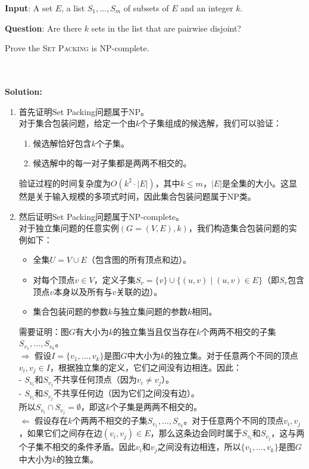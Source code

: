\documentclass{article}
\newcounter{exercise}
\newcommand{\<}{
    \langle}
\renewcommand{\>}{
    \rangle}
\begin{document}
{\begin{exercise}
{\bf Input}: A set $E$, a list $S_1,\ldots, S_m$ of subsets of $E$ and an integer $k$.

{\bf Question}: Are there $k$ sets in the list that are pairwise disjoint?

Prove the \textsc{Set Packing} is NP-complete.
\end{exercise}
\\\\
\noindent\textbf{Solution:}
\begin{enumerate}
    \item 首先证明Set Packing问题属于NP。\\
    对于集合包装问题，给定一个由$k$个子集组成的候选解，我们可以验证：
    \begin{enumerate}
        \item 候选解恰好包含$k$个子集。
        \item 候选解中的每一对子集都是两两不相交的。
    \end{enumerate}
    验证过程的时间复杂度为$O(k^2 \cdot |E|)$，其中$k \leq m$，$|E|$是全集的大小。这显然是关于输入规模的多项式时间，因此集合包装问题属于NP类。
    \item 然后证明Set Packing问题属于NP-complete。\\
    对于独立集问题的任意实例$(G=(V,E), k)$，我们构造集合包装问题的实例如下：
    \begin{itemize}
        \item 全集$U = V \cup E$（包含图的所有顶点和边）。
        \item 对每个顶点$v \in V$，定义子集$S_v = \{v\} \cup \{ (u,v) \mid (u,v) \in E \}$（即$S_v$包含顶点$v$本身以及所有与$v$关联的边）。
        \item 集合包装问题的参数$k$与独立集问题的参数$k$相同。
    \end{itemize}
    需要证明：图$G$有大小为$k$的独立集当且仅当存在$k$个两两不相交的子集$S_{v_1},\dots,S_{v_k}$。\\
    \noindent\textbf{$\Rightarrow$} 假设$I = \{v_1, \dots, v_k\}$是图$G$中大小为$k$的独立集。对于任意两个不同的顶点$v_i, v_j \in I$，根据独立集的定义，它们之间没有边相连。因此：\\
    - $S_{v_i}$和$S_{v_j}$不共享任何顶点（因为$v_i \neq v_j$）。\\
    - $S_{v_i}$和$S_{v_j}$不共享任何边（因为它们之间没有边）。\\
    所以$S_{v_i} \cap S_{v_j} = \emptyset$，即这$k$个子集是两两不相交的。\\

    \noindent\textbf{$\Leftarrow$} 假设存在$k$个两两不相交的子集$S_{v_1}, \dots, S_{v_k}$。对于任意两个不同的顶点$v_i, v_j$，如果它们之间存在边$(v_i, v_j) \in E$，那么这条边会同时属于$S_{v_i}$和$S_{v_j}$，这与两个子集不相交的条件矛盾。因此$v_i$和$v_j$之间没有边相连，所以$\{v_1, \dots, v_k\}$是图$G$中大小为$k$的独立集。\\


\end{enumerate}}
\end{document}
